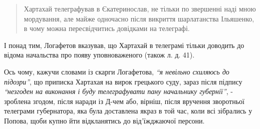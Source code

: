 \documentclass[a4paper,20pt]{report}
\begin{document}
\begin{quote}
\em\bfseries

Хартахай телеграфував в Єкатеринослав, не тільки по звершенні наді мною мордування,
але майже одночасно після викриття шарлатанства Ільяшенко, в чому можна 
пересвідчитись довідками на телеграфі.
\end{quote}

І понад тим, Логафетов вказував, що Хартахай в телеграмі тільки доводить до
відома начальства про появу уповноваженого (також л. д. 41).

Ось чому, кажучи словами із скарги Логафетова, \emph{``я невільно схиляюсь до підозри''},
що приписка Хартахая на вирок грецького суду, зараз після підпису \emph{``незгоден на виконання і буду
телеграфувати пану начальнику губернії''}, - зроблена згодом, після наради із Д-чем або, вірніш,
після вручення зворотньої телеграми губернатора, яка була доставлена якраз в той час, коли всі
зібрались у Попова, щоби купно йти відкланятись до від'їжджаючої персони.
\end{document}
